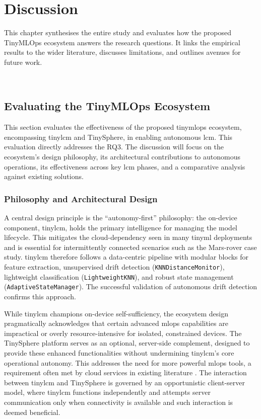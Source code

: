
\chapter{Discussion}
\label{chp:Discussion}

This chapter synthesises the entire study and evaluates how the proposed TinyMLOps ecosystem answers the research questions. It links the empirical results to the wider literature, discusses limitations, and outlines avenues for future work.

~\\
\vfill
\minitoc
\clearpage


\section{Evaluating the TinyMLOps Ecosystem}
\label{sec:evaluating_ecosystem}

This section evaluates the effectiveness of the proposed \gls{tinymlops} ecosystem, encompassing \gls{tinylcm} and TinySphere, in enabling autonomous \gls{lcm}. This evaluation directly addresses the RQ3. The discussion will focus on the ecosystem's design philosophy, its architectural contributions to autonomous operations, its effectiveness across key \gls{lcm} phases, and a comparative analysis against existing solutions.

\subsection{Philosophy and Architectural Design}
\label{ssec:autonomy_first_philosophy}

A central design principle is the ``autonomy-first'' philosophy: the on-device component, \gls{tinylcm}, holds the primary intelligence for managing the model lifecycle.  
This mitigates the cloud-dependency seen in many \gls{tinyml} deployments and is essential for intermittently connected scenarios such as the Mars-rover case study.  \gls{tinylcm} therefore follows a data-centric pipeline with modular blocks for feature extraction, unsupervised drift detection (\texttt{KNNDistanceMonitor}), lightweight classification (\texttt{LightweightKNN}), and robust state management (\texttt{AdaptiveStateManager}).  The successful validation of autonomous drift detection confirms this approach.
  
While \gls{tinylcm} champions on-device self-sufficiency, the ecosystem design pragmatically acknowledges that certain advanced \gls{mlops} capabilities are impractical or overly resource-intensive for isolated, constrained devices. The TinySphere platform serves as an optional, server-side complement, designed to provide these enhanced functionalities without undermining \gls{tinylcm}'s core operational autonomy. This addresses the need for more powerful \gls{mlops} tools, a requirement often met by cloud services in existing literature \cite{banburyEdgeImpulseMLOps2023,alselekAgileAIFirmware2024}. The interaction between \gls{tinylcm} and TinySphere is governed by an opportunistic client-server model, where \gls{tinylcm} functions independently and attempts server communication only when connectivity is available and such interaction is deemed beneficial.

